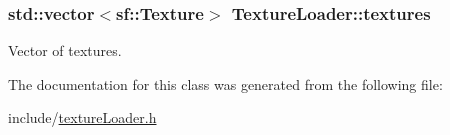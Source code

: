 \subsubsection[{\texorpdfstring{textures}{textures}}]{\setlength{\rightskip}{0pt plus 5cm}std\+::vector$<$sf\+::\+Texture$>$ Texture\+Loader\+::textures\hspace{0.3cm}{\ttfamily [private]}}\hypertarget{class_texture_loader_ad4e7dba3bb89484d7c92b702423cfc77}{}\label{class_texture_loader_ad4e7dba3bb89484d7c92b702423cfc77}
Vector of textures. 

The documentation for this class was generated from the following file\+:\begin{DoxyCompactItemize}
\item 
include/\hyperlink{texture_loader_8h}{texture\+Loader.\+h}\end{DoxyCompactItemize}
